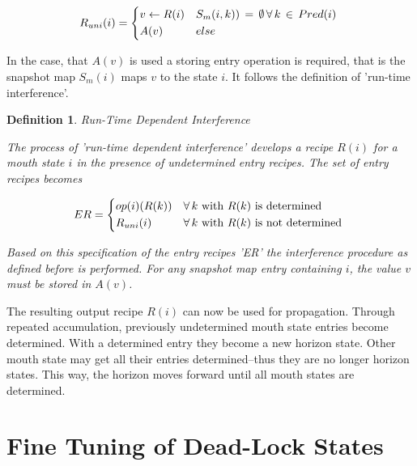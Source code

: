 \documentclass[12pt,a4paper]{scrartcl}
\theoremstyle{break}
\newtheorem{definition}{Definition}
\begin{document}
\begin{equation}
    R_{uni}(i) = \begin{dcases*}
            v \leftarrow R(i) & $S_m(i,k))\,=\,\emptyset\,\forall\,k\,\in\,Pred(i)$ \\
            A(v)              & $else$
            \end{dcases*}
\end{equation}

In the case, that $A(v)$ is used a storing entry operation is required, that is
the snapshot map $S_m(i)$ maps $v$ to the state $i$. It follows the definition of
'run-time interference'.

\begin{definition}
Run-Time Dependent Interference

The process of 'run-time dependent interference' develops a recipe $R(i)$
for a mouth state $i$ in the presence of undetermined entry recipes. The
set of entry recipes becomes

\begin{equation}
    ER = \begin{dcases*}
            op(i)(R(k)) & $\forall\,k$ with $R(k)$ is determined \\
            R_{uni}(i)  & $\forall\,k$ with $R(k)$ is not determined
        \end{dcases*}
\end{equation}

Based on this specification of the entry recipes 'ER' the interference
procedure as defined before is performed. For any snapshot map entry
containing $i$, the value $v$ must be stored in $A(v)$.
\end{definition}

The resulting output recipe $R(i)$ can now be used for propagation. Through
repeated accumulation, previously undetermined mouth state entries become
determined. With a determined entry they become a new horizon state. Other
mouth state may get all their entries determined--thus they are no longer
horizon states. This way, the horizon moves forward until all mouth states are
determined. 

%
\section{Fine Tuning of Dead-Lock States}
\end{document}
